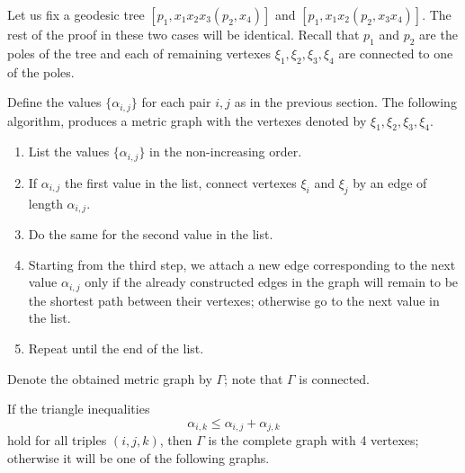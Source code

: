 Let us fix a geodesic tree $[p_1,x_1x_2x_3(p_2,x_4)]$ and $[p_1,x_1x_2(p_2,x_3x_4)]$.
The rest of the proof in these two cases will be identical.
Recall that $p_1$ and $p_2$ are the poles of the tree and each of remaining vertexes $\xi_1,\xi_2, \xi_3,\xi_4$ are connected to one of the poles.

Define the values $\{\alpha_{i,j}\}$ for each pair $i,j$ as in the previous section.
The following algorithm, produces a metric graph with the vertexes denoted by $\xi_1,\xi_2, \xi_3,\xi_4$.
\begin{enumerate}[1.]
\item List the values $\{\alpha_{i,j}\}$ in the non-increasing order.
\item If $\alpha_{i,j}$ the first value in the list, connect vertexes $\xi_i$ and $\xi_j$ by an edge of length $\alpha_{i,j}$.
\item Do the same for the second value  in the list.
\item Starting from the third step, we attach a new edge corresponding to the next value $\alpha_{i,j}$ only if the already constructed edges in the graph will remain to be the shortest path between their vertexes; otherwise go to the next value in the list. 
\item Repeat until the end of the list.
\end{enumerate}
Denote the obtained metric graph by $\Gamma$;
note that $\Gamma$ is connected. 

If the triangle inequalities 
\[\alpha_{i,k}\le \alpha_{i,j}+\alpha_{j,k}\]
hold for all triples $(i,j,k)$, then $\Gamma$ is the complete graph with 4 vertexes;
otherwise it will be one of the following graphs.

